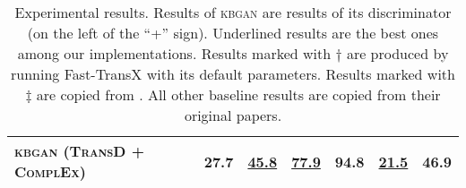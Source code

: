 \begin{table*}[t]
\begin{tabular}{|l|cc|cc|cc|}
\textsc{kbgan} (\textsc{TransD} + \textsc{ComplEx})   & 27.7 & \textbf{\underline{45.8}} & \underline{77.9} & 94.8 & \underline{21.5} & 46.9\\ \hline
\end{tabular}
\caption{Experimental results. Results of \textsc{kbgan} are results of its discriminator (on the left of the ``+'' sign). Underlined results are the best ones among our implementations. Results marked with $\dag$ are produced by running Fast-TransX \cite{lin2015learning} with its default parameters. Results marked with $\ddag$ are copied from \cite{conve}. All other baseline results are copied from their original papers.}
\label{tab:results}
\end{table*}
